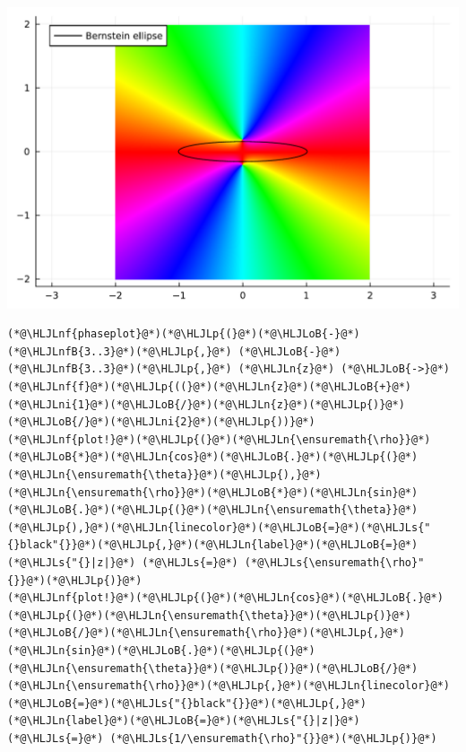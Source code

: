 \documentclass[12pt,a4paper]{article}
\newcommand{\HLJLn}[1]{#1}
\newcommand{\HLJLnf}[1]{\textcolor[RGB]{66,102,213}{#1}}
\newcommand{\HLJLs}[1]{\textcolor[RGB]{201,61,57}{#1}}
\newcommand{\HLJLnfB}[1]{\textcolor[RGB]{59,151,46}{#1}}
\newcommand{\HLJLni}[1]{\textcolor[RGB]{59,151,46}{#1}}
\newcommand{\HLJLoB}[1]{\textcolor[RGB]{102,102,102}{\textbf{#1}}}
\newcommand{\HLJLp}[1]{#1}
\begin{document}
\includegraphics[width=\linewidth]{jl_dOthw0/OP_methods_26_1.pdf}

\begin{lstlisting}
(*@\HLJLnf{phaseplot}@*)(*@\HLJLp{(}@*)(*@\HLJLoB{-}@*)(*@\HLJLnfB{3..3}@*)(*@\HLJLp{,}@*) (*@\HLJLoB{-}@*)(*@\HLJLnfB{3..3}@*)(*@\HLJLp{,}@*) (*@\HLJLn{z}@*) (*@\HLJLoB{->}@*) (*@\HLJLnf{f}@*)(*@\HLJLp{((}@*)(*@\HLJLn{z}@*)(*@\HLJLoB{+}@*)(*@\HLJLni{1}@*)(*@\HLJLoB{/}@*)(*@\HLJLn{z}@*)(*@\HLJLp{)}@*)(*@\HLJLoB{/}@*)(*@\HLJLni{2}@*)(*@\HLJLp{))}@*)
(*@\HLJLnf{plot!}@*)(*@\HLJLp{(}@*)(*@\HLJLn{\ensuremath{\rho}}@*)(*@\HLJLoB{*}@*)(*@\HLJLn{cos}@*)(*@\HLJLoB{.}@*)(*@\HLJLp{(}@*)(*@\HLJLn{\ensuremath{\theta}}@*)(*@\HLJLp{),}@*)(*@\HLJLn{\ensuremath{\rho}}@*)(*@\HLJLoB{*}@*)(*@\HLJLn{sin}@*)(*@\HLJLoB{.}@*)(*@\HLJLp{(}@*)(*@\HLJLn{\ensuremath{\theta}}@*)(*@\HLJLp{),}@*)(*@\HLJLn{linecolor}@*)(*@\HLJLoB{=}@*)(*@\HLJLs{"{}black"{}}@*)(*@\HLJLp{,}@*)(*@\HLJLn{label}@*)(*@\HLJLoB{=}@*)(*@\HLJLs{"{}|z|}@*) (*@\HLJLs{=}@*) (*@\HLJLs{\ensuremath{\rho}"{}}@*)(*@\HLJLp{)}@*)
(*@\HLJLnf{plot!}@*)(*@\HLJLp{(}@*)(*@\HLJLn{cos}@*)(*@\HLJLoB{.}@*)(*@\HLJLp{(}@*)(*@\HLJLn{\ensuremath{\theta}}@*)(*@\HLJLp{)}@*)(*@\HLJLoB{/}@*)(*@\HLJLn{\ensuremath{\rho}}@*)(*@\HLJLp{,}@*)(*@\HLJLn{sin}@*)(*@\HLJLoB{.}@*)(*@\HLJLp{(}@*)(*@\HLJLn{\ensuremath{\theta}}@*)(*@\HLJLp{)}@*)(*@\HLJLoB{/}@*)(*@\HLJLn{\ensuremath{\rho}}@*)(*@\HLJLp{,}@*)(*@\HLJLn{linecolor}@*)(*@\HLJLoB{=}@*)(*@\HLJLs{"{}black"{}}@*)(*@\HLJLp{,}@*)(*@\HLJLn{label}@*)(*@\HLJLoB{=}@*)(*@\HLJLs{"{}|z|}@*) (*@\HLJLs{=}@*) (*@\HLJLs{1/\ensuremath{\rho}"{}}@*)(*@\HLJLp{)}@*)
\end{lstlisting}
\end{document}
